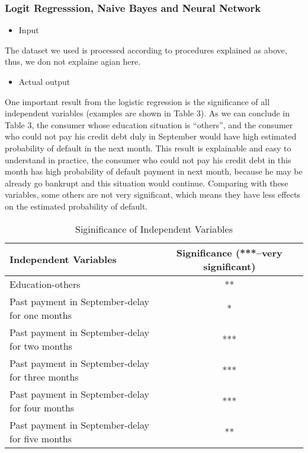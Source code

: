 \documentclass[a4paper,11pt]{article}
\begin{document}
\subsubsection{Logit Regresssion, Naive Bayes and Neural Network}
\begin{itemize}
	\item Input
\end{itemize}
The dataset we used is processed according to procedures explained as above, thus, we don not explaine agian here.
\begin{itemize}
	\item Actual output
\end{itemize}
One important result from the logistic regression is the significance of all independent variables (examples are shown in Table 3). As we can conclude in Table 3, the consumer whose education situation is ``others'', and the consumer who could not pay his credit debt duly in September would have high estimated probability of default in the next month. This result is explainable and easy to understand in practice, the consumer who could not pay his credit debt in this month has high probability of default payment in next month, because he may be already go bankrupt and this situation would continue. Comparing with these variables, some others are not very significant, which means they have less effects on the estimated probability of default.
\begin{table}[ht]
	\begin{center}
		{\footnotesize
			\begin{tabular}{l|cc}
				\hline \hline
				Independent Variables & Significance (***--very significant)& \\
				\hline
				Education-others  & ** \\
				Past payment in September-delay for one months & *  \\
				Past payment in September-delay for two months   &  *** \\
				Past payment in September-delay for three months    & ***  \\
				Past payment in September-delay for four months   &  *** \\
				Past payment in September-delay for five months  & ** \\
				\hline \hline
		\end{tabular}}
	\end{center}
	\caption{Siginificance of Independent Variables}
\end{table}
\end{document}
